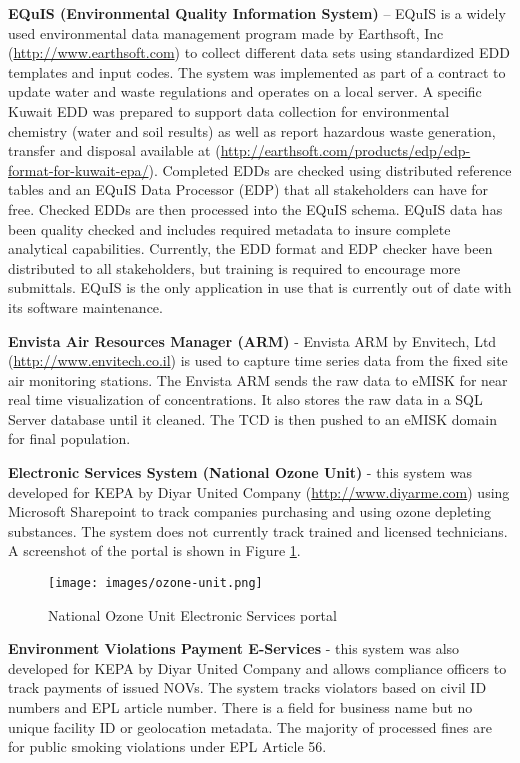 \textbf{EQuIS (Environmental Quality Information System)} – EQuIS is a widely used environmental data management program made by Earthsoft, Inc (\url{http://www.earthsoft.com}) to collect different data sets using standardized EDD templates and input codes. The system was implemented as part of a contract to update water and waste regulations and operates on a local server. A specific Kuwait EDD was prepared to support data collection for environmental chemistry (water and soil results) as well as report hazardous waste generation, transfer and disposal available at (\url{http://earthsoft.com/products/edp/edp-format-for-kuwait-epa/}). Completed EDDs are checked using distributed reference tables and an EQuIS Data Processor (EDP) that all stakeholders can have for free. Checked EDDs are then processed into the EQuIS schema. EQuIS data has been quality checked and includes required metadata to insure complete analytical capabilities. Currently, the EDD format and EDP checker have been distributed to all stakeholders, but training is required to encourage more submittals. EQuIS is the only application in use that is currently out of date with its software maintenance.

\textbf{Envista Air Resources Manager (ARM)} - Envista ARM by Envitech, Ltd (\url{http://www.envitech.co.il}) is used to capture time series data from the fixed site air monitoring stations. The Envista ARM sends the raw data to eMISK for near real time visualization of concentrations. It also stores the raw data in a SQL Server database until it cleaned. The TCD is then pushed to an eMISK domain for final population. 

\textbf{Electronic Services System (National Ozone Unit)} - this system was developed for KEPA by Diyar United Company (\url{http://www.diyarme.com}) using Microsoft Sharepoint to track companies purchasing and using ozone depleting substances. The system does not currently track trained and licensed technicians. A screenshot of the portal is shown in Figure \ref{fig:ozone-unit}.

%
\begin{figure}[!htpb]
\centering
\texttt{[image: images/ozone-unit.png]} 
\caption{National Ozone Unit Electronic Services portal}
\label{fig:ozone-unit}
\end{figure}
%

\textbf{Environment Violations Payment E-Services} - this system was also developed for KEPA by Diyar United Company and allows compliance officers to track payments of issued NOVs. The system tracks violators based on civil ID numbers and EPL article number. There is a field for business name but no unique facility ID or geolocation metadata. The majority of processed fines are for public smoking violations under EPL Article 56.

